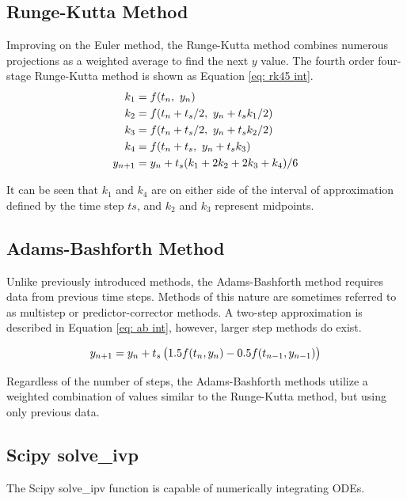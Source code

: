 \documentclass[12pt]{report}
\begin{document}
\subsection{Runge-Kutta Method}
Improving on the Euler method, the Runge-Kutta method combines numerous projections as a weighted average to find the next $y$ value.
The fourth order four-stage Runge-Kutta method is shown as Equation \ref{eq: rk45 int}. 
\begin{equation}{\label{eq: rk45 int} }
\begin{aligned}
    k_1 &= f(t_n, \ y_n)\\
    k_2 &= f(t_n+t_s/2, \ y_n+t_s k_1/2)\\
    k_3 &= f(t_n+t_s/2, \ y_n+t_s k_2/2)\\
    k_4 &= f(t_n+t_s, \ y_n+t_sk_3)\\
    y_{n+1} &= y_n + t_s(k_1+2k_2+2k_3+k_4)/6
    \end{aligned}
\end{equation}%

\noindent It can be seen that $k_1$ and $k_4$ are on either side of the interval of approximation defined by the time step $ts$, and $k_2$ and $k_3$ represent midpoints.

\subsection{Adams-Bashforth Method}
Unlike previously introduced methods, the Adams-Bashforth method requires data from previous time steps.
Methods of this nature are sometimes referred to as multistep or predictor-corrector methods.
A two-step approximation is described in Equation \ref{eq: ab int}, however, larger step methods do exist.

\begin{equation}{\label{eq: ab int} }
y_{n+1} = y_n + t_s \left( 1.5 f(t_n, y_n) - 0.5 f(t_{n-1}, y_{n-1}) \right)
\end{equation}%

\noindent Regardless of the number of steps,  the Adams-Bashforth methods utilize a  weighted combination of values similar to the Runge-Kutta method, but using only previous data.



\subsection{Scipy solve\_ivp}
The Scipy solve\_ipv function is capable of numerically integrating ODEs.
\end{document}
